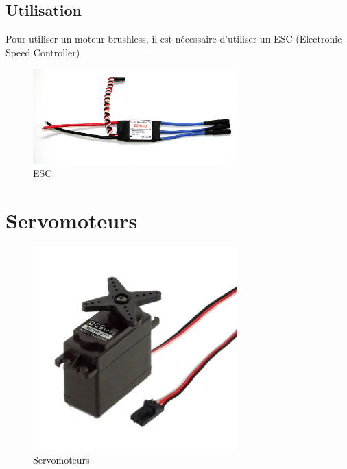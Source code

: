 \documentclass[a4paper, 11pt]{report}
\begin{document}
\subsection{Utilisation}
Pour utiliser un moteur brushless, il est nécessaire d'utiliser un  ESC (Electronic Speed Controller) 

\begin{figure}[h]
\begin{centering}
\includegraphics[width=0.7\textwidth]{images/ESC.jpg}
\caption{ESC}
\par\end{centering}
\end{figure}

\section{Servomoteurs}

\begin{figure}[h]
\begin{centering}
\includegraphics[width=0.7\textwidth]{images/servomoteur.jpg}
\caption{Servomoteurs}
\par\end{centering}
\end{figure}
\end{document}
